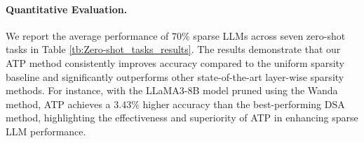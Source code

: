 \paragraph{Quantitative Evaluation.}  
We report the average performance of 70$\%$ sparse LLMs across seven zero-shot tasks in Table \ref{tb:Zero-shot_tasks_results}. The results demonstrate that our ATP method consistently improves accuracy compared to the uniform sparsity baseline and significantly outperforms other state-of-the-art layer-wise sparsity methods. For instance, with the LLaMA3-8B model pruned using the Wanda method, ATP achieves a 3.43$\%$ higher accuracy than the best-performing DSA method, highlighting the effectiveness and superiority of ATP in enhancing sparse LLM performance.  
\begin{table*}[t]
    \centering
    \caption{Comparison of the average zero-shot accuracy across 7 tasks for 70$\%$ sparse LLMs obtained using various sparsity methods.}
    \label{tb:Zero-shot_tasks_results}
\end{table*}
